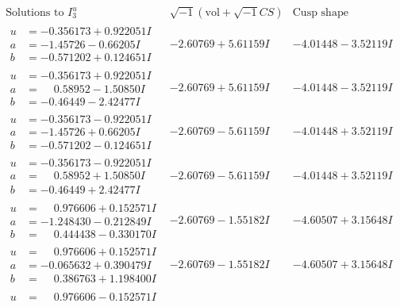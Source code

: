 \documentclass[1p]{elsarticle_modified}
\theoremstyle{definition}
\newcommand{\I}{\sqrt{-1}}
\begin{document}
$$\begin{array}{c|c|c}  
\text{Solutions to }I^u_{3}& \I (\text{vol} + \sqrt{-1}CS) & \text{Cusp shape}\\
 \hline 
\begin{aligned}
u &= -0.356173 + 0.922051 I \\
a &= -1.45726 - 0.66205 I \\
b &= -0.571202 + 0.124651 I\end{aligned}
 & -2.60769 + 5.61159 I & -4.01448 - 3.52119 I \\ \hline\begin{aligned}
u &= -0.356173 + 0.922051 I \\
a &= \phantom{-}0.58952 - 1.50850 I \\
b &= -0.46449 - 2.42477 I\end{aligned}
 & -2.60769 + 5.61159 I & -4.01448 - 3.52119 I \\ \hline\begin{aligned}
u &= -0.356173 - 0.922051 I \\
a &= -1.45726 + 0.66205 I \\
b &= -0.571202 - 0.124651 I\end{aligned}
 & -2.60769 - 5.61159 I & -4.01448 + 3.52119 I \\ \hline\begin{aligned}
u &= -0.356173 - 0.922051 I \\
a &= \phantom{-}0.58952 + 1.50850 I \\
b &= -0.46449 + 2.42477 I\end{aligned}
 & -2.60769 - 5.61159 I & -4.01448 + 3.52119 I \\ \hline\begin{aligned}
u &= \phantom{-}0.976606 + 0.152571 I \\
a &= -1.248430 - 0.212849 I \\
b &= \phantom{-}0.444438 - 0.330170 I\end{aligned}
 & -2.60769 - 1.55182 I & -4.60507 + 3.15648 I \\ \hline\begin{aligned}
u &= \phantom{-}0.976606 + 0.152571 I \\
a &= -0.065632 + 0.390479 I \\
b &= \phantom{-}0.386763 + 1.198400 I\end{aligned}
 & -2.60769 - 1.55182 I & -4.60507 + 3.15648 I \\ \hline\begin{aligned}
u &= \phantom{-}0.976606 - 0.152571 I \\

\end{aligned}
\end{array}$$
\end{document}
